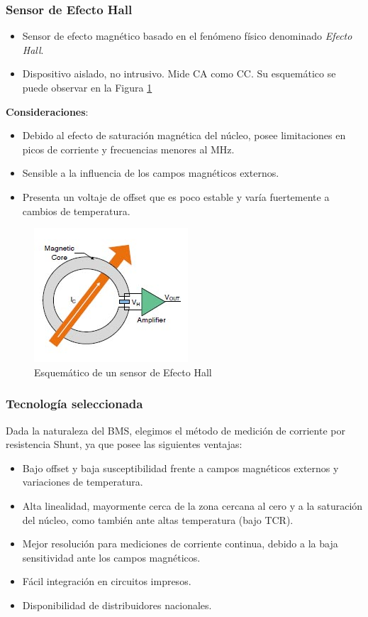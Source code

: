 \documentclass[10pt]{beamer}
\theoremstyle{remark}
\theoremstyle{definition}
\begin{document}
\begin{frame}[allowframebreaks]
  \frametitle{Sensor de Efecto Hall}
  \begin{itemize}
	\item Sensor de efecto magnético basado en el fenómeno físico denominado
	  \emph{Efecto Hall}.
	\item Dispositivo aislado, no intrusivo. Mide CA como CC. Su esquemático
	  se puede observar en la Figura \ref{sch_hall}
  \end{itemize}

  \textbf{Consideraciones}:
  \begin{itemize}
	\item Debido al efecto de saturación magnética del núcleo, posee
	  limitaciones en picos de corriente y frecuencias menores al MHz.
	\item Sensible a la influencia de los campos magnéticos externos.
	\item Presenta un voltaje de offset que es poco estable y varía
	  fuertemente a cambios de temperatura.
  \end{itemize}

  \begin{figure}[h!]
	\includegraphics{./images/Open-loop_Hall_Sensor.jpg}
	\caption{Esquemático de un sensor de Efecto Hall}
	\label{sch_hall}
  \end{figure}
\end{frame}

\begin{frame}[allowframebreaks]
  \frametitle{Tecnología seleccionada}
  Dada la naturaleza del BMS, elegimos el método de medición de corriente por
  resistencia Shunt, ya que posee las siguientes ventajas:

  \begin{itemize}
	\item Bajo offset y baja susceptibilidad frente a campos magnéticos externos
	  y variaciones de temperatura.
	\item Alta linealidad, mayormente cerca de la zona cercana al cero y a la
	  saturación del núcleo, como también ante altas temperatura (bajo TCR).
	\item Mejor resolución para mediciones de corriente continua, debido a la
	  baja sensitividad ante los campos magnéticos.
	\item Fácil integración en circuitos impresos.
	\item Disponibilidad de distribuidores nacionales.
  \end{itemize}

\end{frame}
\end{document}
